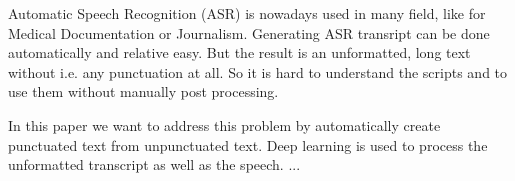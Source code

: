 Automatic Speech Recognition (ASR) is nowadays used in many field, like for Medical Documentation or Journalism. 
Generating ASR transript can be done automatically and relative easy. 
But the result is an unformatted, long text without i.e. any punctuation at all. 
So it is hard to understand the scripts and to use them without manually post processing.

In this paper we want to address this problem by automatically create punctuated text from unpunctuated text.
Deep learning is used to process the unformatted transcript as well as the speech.
...


